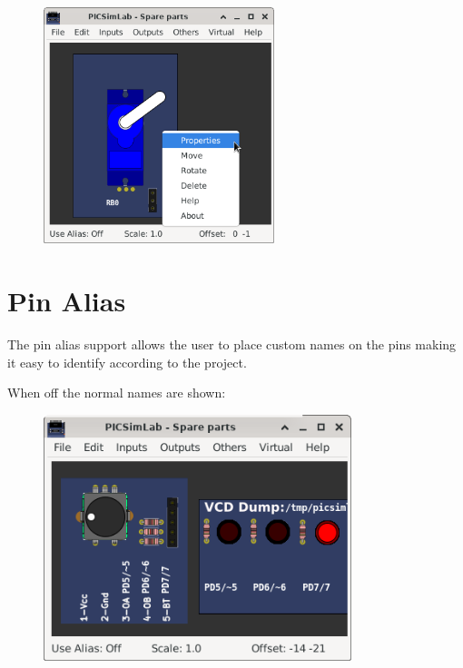 \begin{figure}[H]
\center
\includegraphics[width=0.60\textwidth]{img/spare_pmenu.png} 
\end{figure} 

\section{Pin Alias}

The pin alias support allows the user to place custom names on the pins making it easy to 
identify according to the project. 

When off the normal names are shown:
\begin{figure}[H]
\center
\includegraphics[width=0.80\textwidth]{img/pin_alias_off.png} 
\end{figure} 

